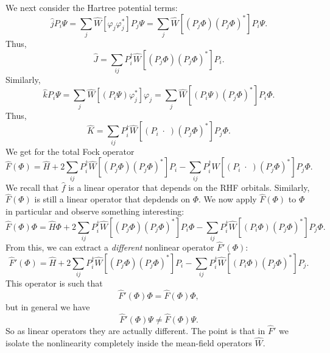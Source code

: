 \documentclass[12pt]{article}
\begin{document}
We next consider the Hartree potential terms: 
\begin{equation}
    \hat{j} P_i \Psi = \sum_j \hat{W}[\varphi_j \varphi_j^*] P_j\Psi = \sum_j \hat{W}[(P_j \Phi) (P_j\Phi)^*] P_i \Psi.
\end{equation}
Thus,
\begin{equation}
    \hat{J} = \sum_{ij} P_i^\dag \hat{W}[(P_j \Phi) (P_j\Phi)^*]  P_i.
\end{equation}
Similarly,
\begin{equation}
    \hat{k} P_i \Psi = \sum_j \hat{W}[(P_i\Psi) \varphi_j^*] \varphi_j = \sum_j \hat{W}[(P_i \Psi) (P_j\Phi)^*] P_i \Phi.
\end{equation}
Thus,
\begin{equation}
    \hat{K} = \sum_{ij} P_i^\dag \hat{W}[(P_i \; \cdot\; ) (P_j\Phi)^*]  P_j\Phi.
\end{equation}
We get for the total Fock operator
\begin{equation}
    \hat{F}(\Phi) = \hat{H} + 2 \sum_{ij} P_i^\dag \hat{W}[(P_j \Phi) (P_j\Phi)^*]  P_i - \sum_{ij} P_i^\dag \hat{W}[(P_i \; \cdot\; ) (P_j\Phi)^*]  P_j \Phi.
\end{equation}
We recall that $\hat{f}$ is a linear operator that depends on the RHF orbitals. Similarly, $\hat{F}(\Phi)$ is still a linear operator that depdends on $\Phi$. We now apply $\hat{F}(\Phi)$ to $\Phi$ in particular and observe something interesting:
\begin{equation}
    \hat{F}(\Phi) \Phi = \hat{H} \Phi + 2 \sum_{ij} P_i^\dag \hat{W}[(P_j \Phi) (P_j\Phi)^*]  P_i \Phi - \sum_{ij} P_i^\dag \hat{W}[(P_i \Phi ) (P_j\Phi)^*]  P_j\Phi.
\end{equation}
From this, we can extract a \emph{different} nonlinear operator $\hat{F}'(\Phi)$:
\begin{equation}
    \hat{F}'(\Phi) = \hat{H} + 2 \sum_{ij} P_i^\dag \hat{W}[(P_j \Phi) (P_j\Phi)^*]  P_i - \sum_{ij} P_i^\dag \hat{W}[(P_i \Phi ) (P_j\Phi)^*]  P_j.
\end{equation}
This operator is such that 
\begin{equation}
    \hat{F}'(\Phi) \Phi = \hat{F}(\Phi) \Phi,
\end{equation}
but in general we have
\begin{equation}
    \hat{F}'(\Phi) \Psi \neq \hat{F}(\Phi) \Psi.
\end{equation}
So as linear operators they are actually different. The point is that in $\hat{F}'$ we isolate the nonlinearity completely inside the mean-field operators $\hat{W}$.
\end{document}
